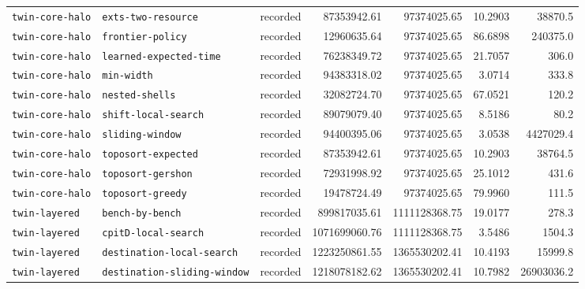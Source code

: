 \begin{longtable}{>{\raggedright\arraybackslash}p{}>{\raggedright\arraybackslash}p{}r r r r r}
\texttt{twin\allowbreak-core\allowbreak-halo} & \texttt{exts\allowbreak-two\allowbreak-resource} & recorded & 87353942.61 & 97374025.65 & 10.2903 & 38870.5 \\
\texttt{twin\allowbreak-core\allowbreak-halo} & \texttt{frontier\allowbreak-policy} & recorded & 12960635.64 & 97374025.65 & 86.6898 & 240375.0 \\
\texttt{twin\allowbreak-core\allowbreak-halo} & \texttt{learned\allowbreak-expected\allowbreak-time} & recorded & 76238349.72 & 97374025.65 & 21.7057 & 306.0 \\
\texttt{twin\allowbreak-core\allowbreak-halo} & \texttt{min\allowbreak-width} & recorded & 94383318.02 & 97374025.65 & 3.0714 & 333.8 \\
\texttt{twin\allowbreak-core\allowbreak-halo} & \texttt{nested\allowbreak-shells} & recorded & 32082724.70 & 97374025.65 & 67.0521 & 120.2 \\
\texttt{twin\allowbreak-core\allowbreak-halo} & \texttt{shift\allowbreak-local\allowbreak-search} & recorded & 89079079.40 & 97374025.65 & 8.5186 & 80.2 \\
\texttt{twin\allowbreak-core\allowbreak-halo} & \texttt{sliding\allowbreak-window} & recorded & 94400395.06 & 97374025.65 & 3.0538 & 4427029.4 \\
\texttt{twin\allowbreak-core\allowbreak-halo} & \texttt{toposort\allowbreak-expected} & recorded & 87353942.61 & 97374025.65 & 10.2903 & 38764.5 \\
\texttt{twin\allowbreak-core\allowbreak-halo} & \texttt{toposort\allowbreak-gershon} & recorded & 72931998.92 & 97374025.65 & 25.1012 & 431.6 \\
\texttt{twin\allowbreak-core\allowbreak-halo} & \texttt{toposort\allowbreak-greedy} & recorded & 19478724.49 & 97374025.65 & 79.9960 & 111.5 \\
\texttt{twin\allowbreak-layered} & \texttt{bench\allowbreak-by\allowbreak-bench} & recorded & 899817035.61 & 1111128368.75 & 19.0177 & 278.3 \\
\texttt{twin\allowbreak-layered} & \texttt{cpitD\allowbreak-local\allowbreak-search} & recorded & 1071699060.76 & 1111128368.75 & 3.5486 & 1504.3 \\
\texttt{twin\allowbreak-layered} & \texttt{destination\allowbreak-local\allowbreak-search} & recorded & 1223250861.55 & 1365530202.41 & 10.4193 & 15999.8 \\
\texttt{twin\allowbreak-layered} & \texttt{destination\allowbreak-sliding\allowbreak-window} & recorded & 1218078182.62 & 1365530202.41 & 10.7982 & 26903036.2 \\

\end{longtable}
